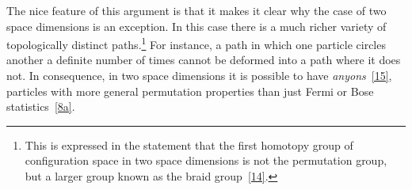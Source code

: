 The nice feature of this argument is that it makes it clear why the case of two
space dimensions is an exception. In this case there is a much richer variety
of topologically distinct paths.\footnote{This is expressed in the statement
that the first homotopy group of configuration space in two space dimensions
is not the permutation group, but a larger group known as the braid
group~\hyperref[ref:9.14]{[14]}.} For instance, a path in which one particle circles another a
definite number of times cannot be deformed into a path where it does not. In
consequence, in two space dimensions it is possible to have
\emph{anyons}~\hyperref[ref:9.15]{[15]}, particles with more general permutation properties than
just Fermi or Bose statistics~\hyperref[ref:9.8a]{[8a]}.
